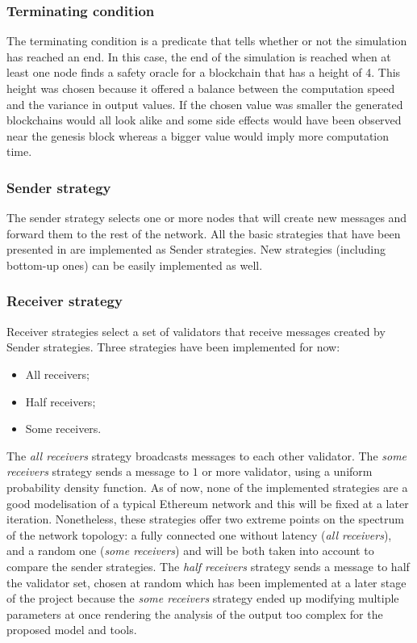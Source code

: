 \subsubsection{Terminating condition}
The terminating condition is a predicate that tells whether or not the simulation has
reached an end. In this case, the end of the simulation is reached when at least
one node finds a safety oracle for a blockchain that has a height of 4. This
height was chosen because it offered a balance between the computation speed and
the variance in output values. If the chosen value was smaller the generated
blockchains would all look alike and some side effects would have been observed
near the genesis block whereas a bigger value would imply more computation time.

\subsubsection{Sender strategy}
The sender strategy selects one or more nodes that will create new messages and
forward them to the rest of the network. All the basic strategies that have been
presented in  are implemented as Sender strategies.
New strategies (including bottom-up ones) can be easily implemented as well.

\subsubsection{Receiver strategy}
Receiver strategies select a set of validators that receive messages created by
Sender strategies. Three strategies have been implemented for now: 
\begin{itemize}
        \item All receivers;
        \item Half receivers;
        \item Some receivers.
\end{itemize}

The \textit{all receivers} strategy broadcasts messages to each other validator.
The \textit{some receivers} strategy sends a message to \(1\) or more validator,
using a uniform probability density function.  As of now, none of the
implemented strategies are a good modelisation of a typical Ethereum network and
this will be fixed at a later iteration.  Nonetheless, these strategies offer
two extreme points on the spectrum of the network topology: a fully connected
one without latency (\textit{all receivers}), and a random one (\textit{some
receivers}) and will be both taken into account to compare the sender
strategies.
The \textit{half receivers} strategy sends a message to half the validator set,
chosen at random which has been implemented at a later stage of the project
because the \textit{some receivers} strategy ended up modifying multiple
parameters at once rendering the analysis of the output too complex for the
proposed model and tools.

